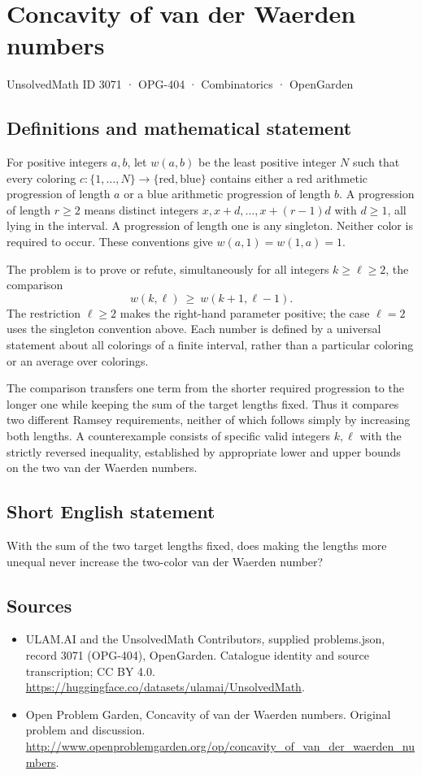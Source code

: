 \documentclass[11pt,a4paper]{article}
\begin{document}
\section*{Concavity of van der Waerden numbers}\label{3071}
{\small UnsolvedMath ID 3071 · OPG-404 · Combinatorics · OpenGarden}
\subsection{Definitions and mathematical statement}
For positive integers $a,b$, let $w(a,b)$ be the least positive integer $N$ such that every coloring $c:\{1,\ldots,N\}\to\{\mathrm{red},\mathrm{blue}\}$ contains either a red arithmetic progression of length $a$ or a blue arithmetic progression of length $b$. A progression of length $r\ge2$ means distinct integers $x,x+d,\ldots,x+(r-1)d$ with $d\ge1$, all lying in the interval. A progression of length one is any singleton. Neither color is required to occur. These conventions give $w(a,1)=w(1,a)=1$.

The problem is to prove or refute, simultaneously for all integers $k\ge\ell\ge2$, the comparison
\[
                   w(k,\ell)\ \ge\ w(k+1,\ell-1).
\]
The restriction $\ell\ge2$ makes the right-hand parameter positive; the case $\ell=2$ uses the singleton convention above. Each number is defined by a universal statement about all colorings of a finite interval, rather than a particular coloring or an average over colorings.

The comparison transfers one term from the shorter required progression to the longer one while keeping the sum of the target lengths fixed. Thus it compares two different Ramsey requirements, neither of which follows simply by increasing both lengths. A counterexample consists of specific valid integers $k,\ell$ with the strictly reversed inequality, established by appropriate lower and upper bounds on the two van der Waerden numbers.
\subsection{Short English statement}
With the sum of the two target lengths fixed, does making the lengths more unequal never increase the two-color van der Waerden number?
\subsection{Sources}
\begin{itemize}
\item[S1] ULAM.AI and the UnsolvedMath Contributors, supplied problems.json, record 3071 (OPG-404), OpenGarden. Catalogue identity and source transcription; CC BY 4.0.
\url{https://huggingface.co/datasets/ulamai/UnsolvedMath}.
\item[S2] Open Problem Garden, Concavity of van der Waerden numbers. Original problem and discussion.
\url{http://www.openproblemgarden.org/op/concavity_of_van_der_waerden_numbers}.
\end{itemize}
\end{document}
